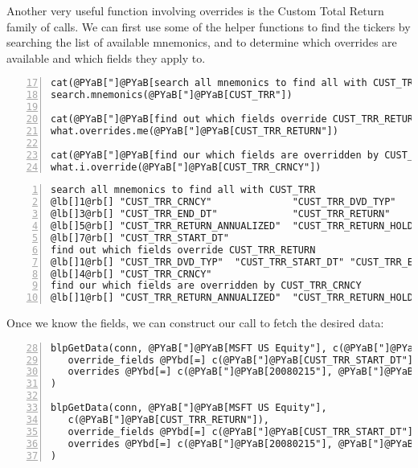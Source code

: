 \documentclass[a4paper]{article}
\begin{document}
    

Another very useful function involving overrides is the Custom Total Return family of calls. We can first use some of the helper functions to find the tickers by searching the list of available mnemonics, and to determine which overrides are available and which fields they apply to.

\begin{Verbatim}[commandchars=@\[\],numbers=left,firstnumber=17,stepnumber=1]
cat(@PYaB["]@PYaB[search all mnemonics to find all with CUST_TRR\n"])
search.mnemonics(@PYaB["]@PYaB[CUST_TRR"])

cat(@PYaB["]@PYaB[find out which fields override CUST_TRR_RETURN\n"])
what.overrides.me(@PYaB["]@PYaB[CUST_TRR_RETURN"])

cat(@PYaB["]@PYaB[find our which fields are overridden by CUST_TRR_CRNCY\n"])
what.i.override(@PYaB["]@PYaB[CUST_TRR_CRNCY"])
\end{Verbatim}

    

\begin{Verbatim}[commandchars=@\[\],numbers=left,firstnumber=1,stepnumber=1]
search all mnemonics to find all with CUST_TRR
@lb[]1@rb[] "CUST_TRR_CRNCY"              "CUST_TRR_DVD_TYP"           
@lb[]3@rb[] "CUST_TRR_END_DT"             "CUST_TRR_RETURN"            
@lb[]5@rb[] "CUST_TRR_RETURN_ANNUALIZED"  "CUST_TRR_RETURN_HOLDING_PER"
@lb[]7@rb[] "CUST_TRR_START_DT"          
find out which fields override CUST_TRR_RETURN
@lb[]1@rb[] "CUST_TRR_DVD_TYP"  "CUST_TRR_START_DT" "CUST_TRR_END_DT"  
@lb[]4@rb[] "CUST_TRR_CRNCY"   
find our which fields are overridden by CUST_TRR_CRNCY
@lb[]1@rb[] "CUST_TRR_RETURN_ANNUALIZED"  "CUST_TRR_RETURN_HOLDING_PER"
\end{Verbatim}

    

Once we know the fields, we can construct our call to fetch the desired data:

\begin{Verbatim}[commandchars=@\[\],numbers=left,firstnumber=28,stepnumber=1]
blpGetData(conn, @PYaB["]@PYaB[MSFT US Equity"], c(@PYaB["]@PYaB[CUST_TRR_RETURN"]),
   override_fields @PYbd[=] c(@PYaB["]@PYaB[CUST_TRR_START_DT"], @PYaB["]@PYaB[CUST_TRR_END_DT"]), 
   overrides @PYbd[=] c(@PYaB["]@PYaB[20080215"], @PYaB["]@PYaB[20080602"])
)

blpGetData(conn, @PYaB["]@PYaB[MSFT US Equity"], 
   c(@PYaB["]@PYaB[CUST_TRR_RETURN"]), 
   override_fields @PYbd[=] c(@PYaB["]@PYaB[CUST_TRR_START_DT"], @PYaB["]@PYaB[CUST_TRR_END_DT"], @PYaB["]@PYaB[CUST_TRR_CRNCY"]), 
   overrides @PYbd[=] c(@PYaB["]@PYaB[20080215"], @PYaB["]@PYaB[20080602"], @PYaB["]@PYaB[GBP"])
)
\end{Verbatim}
\end{document}
